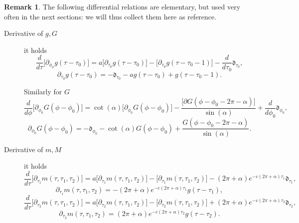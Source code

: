 \documentclass[reqno]{amsart}
\theoremstyle{definition} \newtheorem{definition}{Definition}[section]
\theoremstyle{definition} \newtheorem{remark}[definition]{Remark}
\theoremstyle{plain} \newtheorem{lemma}[definition]{Lemma}
\theoremstyle{plain} \newtheorem{proposition}[definition]{Proposition}
\theoremstyle{plain} \newtheorem{theorem}[definition]{Theorem}
\theoremstyle{plain} \newtheorem{corollary}[definition]{Corollary}
\theoremstyle{definition} \newtheorem{example}[definition]{Example}
\theoremstyle{plain} \newtheorem{claim}[clai]{Claim}
\theoremstyle{definition} \newtheorem{assumption}[definition]{Assumption}
\theoremstyle{definition} \newtheorem{observation}[definition]{Observation}
\newcommand{\1}{\mathbbm 1}
\newcommand{\Diracd}{\mathfrak{d}}
\numberwithin{equation}{section} %
\theoremstyle{plain} \newtheorem*{theorem*}{Theorem}
\theoremstyle{plain} \newtheorem{mthm}[maintheorem]{Main Theorem}
\theoremstyle{plain} \newtheorem*{mthm*}{Main Theorem}
\theoremstyle{plain} \newtheorem*{conjecture*}{Conjecture}
\theoremstyle{plain} \newtheorem{conjecture}[definition]{Conjecture}
\theoremstyle{plain} \newtheorem*{problem*}{Problem}
\begin{document}
\begin{remark}
\label{Rem:diff_relations}
The following differential relations are elementary, but used very often in the next sections: we will thus collect them here as reference.

\begin{description}
\item[Derivative of $g,G$] it holds
\begin{equation*}
\frac{d}{d\tau} \big[ \partial_{\phi_0} g(\tau - \tau_0) \big] = a \big[ \partial_{\tau_0} g(\tau-\tau_0) \big] - \big[ \partial_{\tau_0} g(\tau - \tau_0 - 1) \big] - \frac{d}{d\tau_0} \Diracd_{\tau_0},
\end{equation*}
\begin{equation*}
\partial_{\tau_0} g(\tau-\tau_0) = - \Diracd_{\tau_0} - a g(\tau - \tau_0) + g(\tau - \tau_0 - 1).
\end{equation*}

Similarly for $G$
\begin{equation*}
\frac{d}{d\phi} \big[ \partial_{\phi_0} G(\phi - \phi_0) \big] = \cot(\alpha) \big[ \partial_{\phi_0} G(\phi - \phi_0) \big] - \frac{\big[ \partial G(\phi - \phi_0 - 2\pi - \alpha) \big]}{\sin(\alpha)} + \frac{d}{d\phi_0} \Diracd_{\phi_0},
\end{equation*}
\begin{equation}
\label{Equa:ker_der_G}
\partial_{\phi_0} G(\phi-\phi_0) = - \Diracd_{\phi_0} - \cot(\alpha) G(\phi - \phi_0) + \frac{G(\phi - \phi_0 - 2\pi - \alpha)}{\sin(\alpha)}.
\end{equation}

\item[Derivative of $m,M$] it holds
\begin{equation*}
\frac{d}{d\tau} \big[ \partial_{\tau_1} m(\tau,\tau_1,\tau_2) \big] = a \big[ \partial_{\tau_1} m(\tau,\tau_1,\tau_2) \big] - \big[ \partial_{\tau_1} m(\tau,\tau_1,\tau_2) \big] - (2\pi + \alpha) e^{-c(2\pi + \alpha) \tau_1} \Diracd_{\tau_1},
\end{equation*}
\begin{equation*}
\partial_{\tau_1} m(\tau,\tau_1,\tau_2) = - (2\pi + \alpha) e^{-c(2\pi + \alpha) \tau_1} g(\tau - \tau_1),
\end{equation*}
\begin{equation*}
\frac{d}{d\tau} \big[ \partial_{\tau_2} m(\tau,\tau_1,\tau_2) \big] = a \big[ \partial_{\tau_2} m(\tau,\tau_1,\tau_2) \big] - \big[ \partial_{\tau_2} m(\tau,\tau_1,\tau_2) \big] + (2\pi + \alpha) e^{-c(2\pi + \alpha) \tau_2} \Diracd_{\tau_2},
\end{equation*}
\begin{equation*}
\partial_{\tau_2} m(\tau,\tau_1,\tau_2) = (2\pi + \alpha) e^{-c(2\pi + \alpha) \tau_2} g(\tau - \tau_2).
\end{equation*}


\end{description}
\end{remark}
\end{document}
